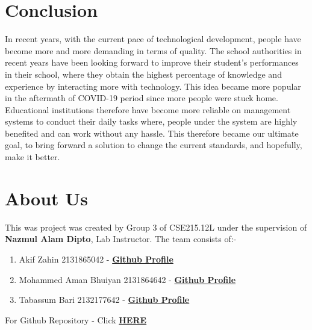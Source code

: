 \documentclass[a4paper,12pt]{article}
\begin{document}
\section{Conclusion}
\enlargethispage{\baselineskip}
In recent years, with the current pace of technological development, people have become
more and more demanding in terms of quality. The school authorities in
recent years have been looking forward to improve their student's performances in their school, where they obtain the highest percentage of knowledge and experience by interacting more with technology. This idea became more popular in the aftermath of COVID-19 period since more people were stuck home. Educational institutions therefore have become more reliable on management systems to conduct their daily tasks where, people under the system are highly benefited and can work without any hassle. This therefore became our ultimate goal, to bring forward a solution to change the current standards, and hopefully, make it better.   
\section{About Us}
This was project was created by Group 3 of CSE215.12L under the supervision of \textbf{Nazmul Alam Dipto}, Lab Instructor. The team consists of:-
\begin{enumerate}
    \item Akif Zahin 2131865042 - \href{https://github.com/akifzahin}{\textbf{Github Profile}}
    \item  Mohammed Aman Bhuiyan 2131864642 - \href{https://github.com/Aman554-EQ}{\textbf{Github Profile}}
    \item Tabassum Bari 2132177642 - \href{https://github.com/TabassumBari}{\textbf{Github Profile}}
\end{enumerate}

\begin{center}
 \large For Github Repository - Click \href{https://github.com/akifzahin/CSE215.12L-Group-3-School-Management-System}{\textbf{HERE}} 
\end{center}

\enlargethispage{\baselineskip}
\end{document}
